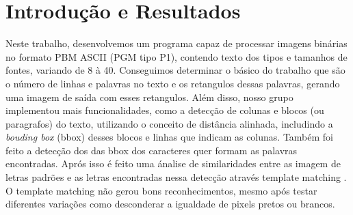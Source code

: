 \documentclass[english, 
               brazil, 
               bsc] %
               {dcomp-abntex2}
\begin{document}


\frenchspacing 




\pretextual




\orientador{}
\coorientador{}







%
%
\imprimircapa
%  
%     
\mostrarSUMARIO




\textual


\chapter{Introdução e Resultados} \label{introduction}

Neste trabalho, desenvolvemos um programa capaz de processar imagens binárias no formato PBM ASCII (PGM tipo P1), contendo texto dos tipos e tamanhos de fontes, variando de 8 à 40. Conseguimos determinar o básico do trabalho que são o número de linhas e palavras no texto e os retangulos dessas palavras, gerando uma imagem de saída com esses retangulos. Além disso, nosso grupo implementou mais funcionalidades, como a detecção de colunas e blocos (ou paragrafos) do texto, utilizando o conceito de distância alinhada, includindo a \textit{bouding box} (bbox) desses blocos e linhas que indicam as colunas. Também foi feito a detecção dos das bbox dos caracteres quer formam as palavras encontradas. Aprós isso é feito uma ánalise de similaridades entre as imagem de letras padrões e as letras encontradas nessa detecção através template matching \cite[12.2]{gonzalez2008digital}. O template matching não gerou bons reconhecimentos, mesmo após testar diferentes variações como desconderar a igualdade de pixels pretos ou brancos.
\end{document}
